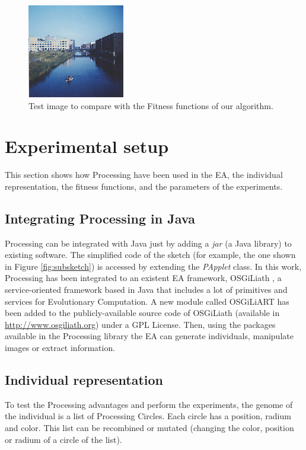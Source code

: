 \documentclass[conference]{IEEEtran}
\begin{document}
\begin{figure}
\centering
   \includegraphics[scale =3] {images/flevopark.eps}
\caption{Test image to compare with the Fitness functions of our algorithm.}
\label{fig:flevopark}
\end{figure}

\section{Experimental setup}
\label{sec:setup}

This section shows how Processing have been used in the EA, the individual representation, the fitness functions, and the parameters of the experiments.

\subsection{Integrating Processing in Java}
Processing can be integrated with Java just by adding a {\em jar} (a Java library) to existing software. The simplified code of the sketch (for example, the one shown in Figure \ref{fig:subsketch}) is accessed by extending the {\em PApplet} class. In this work, Processing has been integrated to an existent EA framework, OSGiLiath \cite{OSGILIATH}, a service-oriented framework based in Java that includes a lot of primitives and services for Evolutionary Computation. A new module called OSGiLiART has been added to the publicly-available source code of OSGiLiath (available in \url{http://www.osgiliath.org}) under a GPL License. Then, using the packages available in the Processing library the EA can generate individuals, manipulate images or extract information.

\subsection{Individual representation}

To test the Processing advantages and perform the experiments, the genome of the individual is a list of Processing Circles. Each circle has a position, radium and color. This list can be recombined or mutated (changing the color, position or radium of a circle of the list).
\end{document}
